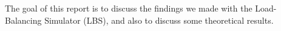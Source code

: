 The goal of this report is to discuss the findings we made with the
Load-Balancing Simulator (LBS), and also to discuss some theoretical
results.
